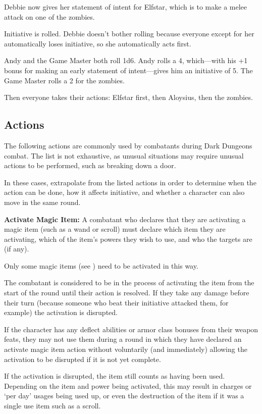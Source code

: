 \begin{multicols*}{2}
{Debbie now gives her statement of intent for Elfstar, which is to make a melee attack on one of the zombies.

Initiative is rolled. Debbie doesn’t bother rolling because everyone except for her automatically loses initiative, so she automatically acts first.

Andy and the Game Master both roll 1d6. Andy rolls a 4, which—with his +1 bonus for making an early statement of intent—gives him an initiative of 5. The Game Master rolls a 2 for the zombies.

Then everyone takes their actions: Elfstar first, then Aloysius, then the zombies.}

\subsection{Actions}\label{sec:Actions}
The following actions are commonly used by combatants during Dark Dungeons combat. The list is not exhaustive, as unusual situations may require unusual actions to be performed, such as breaking down a door.

In these cases, extrapolate from the listed actions in order to determine when the action can be done, how it affects initiative, and whether a character can also move in the same round.

\textbf{Activate Magic Item:} A combatant who declares that they are activating a magic item (such as a wand or scroll) must declare which item they are activating, which of the item’s powers they wish to use, and who the targets are (if any).

Only some magic items (see ) need to be activated in this way.

The combatant is considered to be in the process of activating the item from the start of the round until their action is resolved. If they take any damage before their turn (because someone who beat their initiative attacked them, for example) the activation is disrupted.

If the character has any deflect abilities or armor class bonuses from their weapon feats, they may not use them during a round in which they have declared an activate magic item action without voluntarily (and immediately) allowing the activation to be disrupted if it is not yet complete.

If the activation is disrupted, the item still counts as having been used. Depending on the item and power being activated, this may result in charges or ‘per day’ usages being used up, or even the destruction of the item if it was a single use item such as a scroll.


\end{multicols*}

